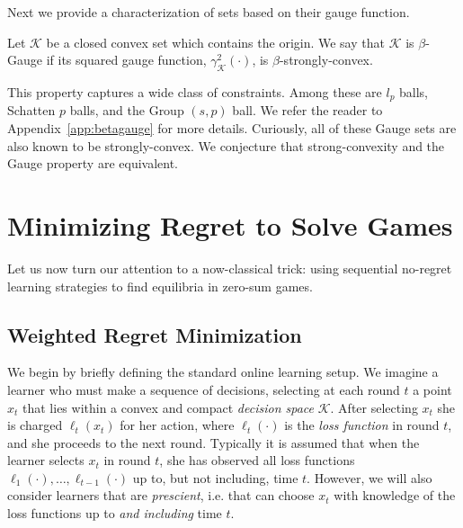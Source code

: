 \documentclass[final,12pt]{colt2018} %
\def\g{\gamma_{\K}}
\def\K{\mathcal{K}}
\begin{document}
Next we provide a  characterization of sets based on their gauge function.
\begin{definition}
Let $\K$ be a closed convex set which contains the origin.
We say that $\K$  is $\beta$-Gauge if its squared gauge function, $\g^2(\cdot)$,  is $\beta$-strongly-convex.
\end{definition}
This property captures a wide class of constraints. Among these are $l_p$ balls, 
Schatten $p$ balls, and the Group $(s,p)$ ball. We refer the reader to Appendix~{\ref{app:betagauge}} for more details. Curiously, all of these Gauge sets are also known to be strongly-convex. We conjecture that strong-convexity and the Gauge property are equivalent.



\section{Minimizing Regret to Solve Games}


Let us now turn our attention to a now-classical trick: using sequential no-regret learning strategies to find equilibria in zero-sum games.

\subsection{Weighted Regret Minimization}

We begin by briefly defining the standard online learning setup. We imagine a learner who must make a sequence of decisions, selecting at each round $t$ a point $x_t$ that lies within a convex and compact \emph{decision space} $\K$.
After selecting $x_t$ she is charged $\ell_t(x_t)$ for her action, where $\ell_{t}(\cdot)$ is the \emph{loss function} in round $t$, and she proceeds to the next round.
Typically it is assumed that when the learner selects $x_t$ in round $t$, she has observed all loss functions $\ell_1(\cdot), \ldots, \ell_{t-1}(\cdot)$ up to, but not including, time $t$. However, we will also consider learners that are \emph{prescient}, i.e. that can choose $x_t$ with knowledge of the loss functions up to \emph{and including} time $t$.
\end{document}
